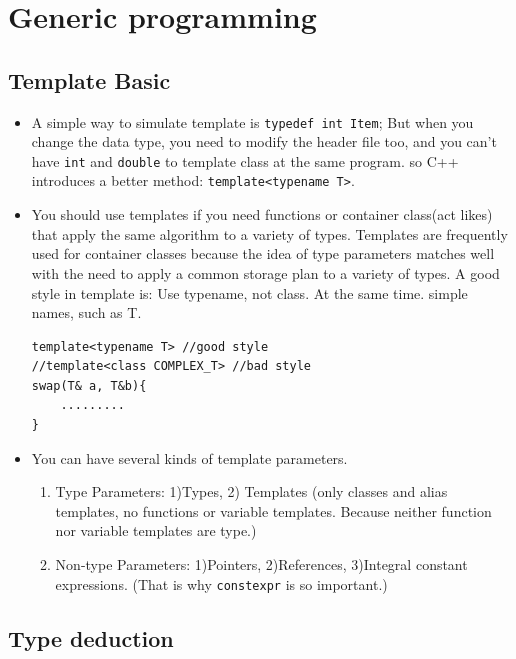 \documentclass[a4paper,11pt,twoside]{book}
\begin{document}
     
\chapter{Generic programming}
     
\section{Template Basic}
\begin{itemize}
    \item A simple way to simulate template is \verb=typedef int Item=; But when you change the data type, you need to modify the header file too, and you can't have \texttt{int} and \texttt{double} to template class at the same program. so C++ introduces a better method: \texttt{template<typename T>}.

    \item You should use templates if you need functions or container class(act likes) that apply the same algorithm to a variety of types. Templates are frequently used for container classes because the idea of type parameters matches well with the need to apply a common storage plan to a variety of types. A good style in template is: Use typename, not class. At the same time. simple names, such as T.
\begin{lstlisting}[numbers=none]
template<typename T> //good style
//template<class COMPLEX_T> //bad style
swap(T& a, T&b){
	.........
}
\end{lstlisting}
    \item You can have several kinds of template parameters.
\begin{enumerate}
    \item  Type Parameters: 1)Types, 2) Templates (only classes and alias templates, no functions or variable templates. Because neither function nor variable templates are type.)
	

	\item Non-type Parameters: 1)Pointers, 2)References, 3)Integral constant expressions. (That is why \texttt{constexpr} is so important.)

\end{enumerate}

\end{itemize}

\section{Type deduction}
\end{document}
